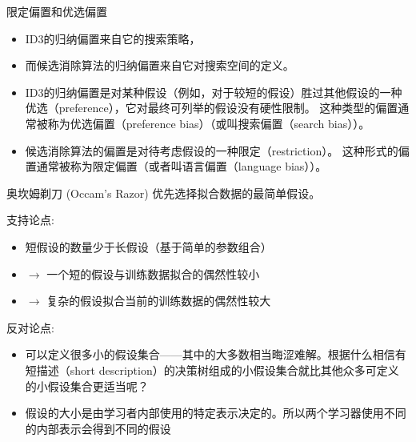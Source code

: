 \documentclass[presentation]{beamer}
\begin{document}
\begin{frame}[label={sec:org59d88a1}]{限定偏置和优选偏置}
\begin{itemize}
\item ID3的归纳偏置来自它的搜索策略，
\item 而候选消除算法的归纳偏置来自它对搜索空间的定义。
\item ID3的归纳偏置是对某种假设（例如，对于较短的假设）胜过其他假设的一种优选（preference），它对最终可列举的假设没有硬性限制。
这种类型的偏置通常被称为优选偏置（preference bias）（或叫搜索偏置（search bias））。
\item 候选消除算法的偏置是对待考虑假设的一种限定（restriction）。
这种形式的偏置通常被称为限定偏置（或者叫语言偏置（language bias））。
\end{itemize}
\end{frame}
\begin{frame}[label={sec:orgd6b5558}]{奥坎姆剃刀 (Occam's Razor)}
优先选择拟合数据的最简单假设。

支持论点:
\begin{itemize}
\item 短假设的数量少于长假设（基于简单的参数组合）
\item \(\rightarrow\) 一个短的假设与训练数据拟合的偶然性较小
\item \(\rightarrow\) 复杂的假设拟合当前的训练数据的偶然性较大
\end{itemize}

反对论点:
\begin{itemize}
\item 可以定义很多小的假设集合——其中的大多数相当晦涩难解。根据什么相信有短描述（short description）的决策树组成的小假设集合就比其他众多可定义的小假设集合更适当呢？
\item 假设的大小是由学习者内部使用的特定表示决定的。所以两个学习器使用不同的内部表示会得到不同的假设
\end{itemize}
\end{frame}
\end{document}
